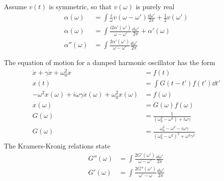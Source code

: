 \documentclass[12pt]{article}
\begin{document}
    \subsubsection{} Assume \(v(t)\) is symmetric, so that \(v(\omega)\) is purely real \begin{align*}
        \alpha(\omega) &=  \int \frac{i}{\omega}  v(\omega - \omega') \frac{\dd{\omega'}}{2\pi} + \frac{1}{2} v(\omega ')\\
        \alpha(\omega) &=  \int \frac{i2\alpha'(\omega ')}{\omega - \omega'}   \frac{\dd{\omega'}}{2\pi} + \alpha'(\omega)\\
        \alpha''(\omega) &= \int \frac{2\alpha'(\omega ')}{\omega - \omega'}   \frac{\dd{\omega'}}{2\pi}
    \end{align*}
    
    The equation of motion for a damped harmonic oscillator has the form \begin{align*}
        \ddot{x} + \gamma \dot{x} + \omega_0^2 x &= f(t)\\
        x(t) &= \int G(t - t') f(t') \dd{t'}\\
        - \omega^2 x(\omega) + i\omega\gamma x(\omega) + \omega_0^2 x(\omega) &= f(\omega)\\
        x(\omega) &= G(\omega) f(\omega)\\
        G(\omega) &= \frac{1}{ (\omega_0^2 - \omega^2) +i\omega \gamma}\\
        G(\omega) &= \frac{\omega_0^2 - \omega^2 - i\omega \gamma}{ (\omega_0^2 - \omega^2)^2 +\omega^2 \gamma^2}
    \end{align*}
    The Kramers-Kronig relations state \begin{align}
        G''(\omega) &= \int \frac{2G'(\omega ')}{\omega - \omega'}   \frac{\dd{\omega'}}{2\pi}\\
        G'(\omega) &= \int \frac{2G''(\omega ')}{\omega' - \omega}   \frac{\dd{\omega'}}{2\pi}
    \end{align}
\end{document}
